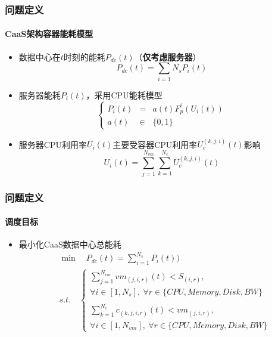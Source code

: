 \begin{frame}
\frametitle{问题定义}
\framesubtitle{CaaS架构容器能耗模型}
\begin{itemize}
    \item 数据中心在$t$时刻的能耗$P_{dc}(t)$（\textbf{仅考虑服务器}）
    \begin{equation}
        P_{dc}(t) = \sum_{i=1}{N_s} P_i(t)
    \end{equation}
    \item 服务器能耗$P_i(t)$，采用CPU能耗模型
    \begin{equation}
    \left\{
        \begin{array}{rcl}
            P_i(t) &=& a(t)F_p^i(U_i(t)) \\
            a(t) &\in& \{0,1\}
        \end{array}
    \right.
    \end{equation}
    \item 服务器CPU利用率$U_i(t)$主要受容器CPU利用率$U_c^{(k,j,i)}(t)$影响
    \begin{equation}
        U_i(t) = \sum_{j=1}^{N_{vm}}\sum_{k=1}^{N_c} U_c^{(k,j,i)}(t)
    \end{equation}
\end{itemize}
\end{frame}


\begin{frame}
\frametitle{问题定义}
\framesubtitle{调度目标}
\begin{itemize}
    \item 最小化CaaS数据中心总能耗
    \begin{equation}
    \begin{align*}
            &\min\quad P_{dc}(t)=\sum_{i=1}^{N_s} P_i(t)) \\
            &s.t.\quad
            \begin{cases}
            \sum_{j=1}^{N_{vm}}vm_{(j,i,r)}(t) < S_(i,r),\\
            \forall i \in [1,N_s],\ \forall r \in \{CPU,Memory,Disk,BW\} \\
            \\
            \sum_{k=1}^{N_{c}}c_{(k,j,i,r)}(t) < vm_(j,i,r),\\
            \forall i \in [1,N_{vm}],\ \forall r \in \{CPU,Memory,Disk,BW\}
            \end{cases}
    \end{align*}
    \end{equation}
\end{itemize}
\end{frame}


